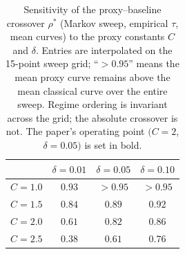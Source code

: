 \documentclass[sensors,article,submit,pdftex,moreauthors]{Definitions/mdpi}
\providecommand{\DIFadd}[1]{{\protect\color{blue}#1}} %
\providecommand{\DIFdel}[1]{} %
\providecommand{\DIFaddend}{} %
\providecommand{\DIFaddFL}[1]{\DIFadd{#1}} %
\providecommand{\DIFdelFL}[1]{\DIFdel{#1}} %
\providecommand{\DIFaddbeginFL}{} %
\providecommand{\DIFaddendFL}{} %
\providecommand{\DIFdelbeginFL}{} %
\providecommand{\DIFdelendFL}{} %
\begin{document}
\DIFaddend \begin{table}[t]
\centering
\caption{\DIFdelbeginFL \DIFdelFL{Proxy-sensitivity ablation: alternative $\tau$ estimators on synthetic streams }\DIFdelendFL \DIFaddbeginFL \DIFaddFL{Sensitivity of the proxy--baseline crossover $\rho^{*}$ }\DIFaddendFL (\DIFdelbeginFL \DIFdelFL{$T = 4096$}\DIFdelendFL \DIFaddbeginFL \DIFaddFL{Markov sweep}\DIFaddendFL , \DIFdelbeginFL \DIFdelFL{$W = 20$}\DIFdelendFL \DIFaddbeginFL \DIFaddFL{empirical $\tau$}\DIFaddendFL , \DIFdelbeginFL \DIFdelFL{$n = 6$}\DIFdelendFL \DIFaddbeginFL \DIFaddFL{mean curves}\DIFaddendFL ) \DIFaddbeginFL \DIFaddFL{to the proxy constants $C$ and $\delta$}\DIFaddendFL . \DIFdelbeginFL \DIFdelFL{Qualitative }\DIFdelendFL \DIFaddbeginFL \DIFaddFL{Entries are interpolated on the 15-point sweep grid; ``$>0.95$'' means the mean proxy curve remains above the mean classical curve over the entire sweep. Regime }\DIFaddendFL ordering \DIFdelbeginFL \DIFdelFL{of regimes by $\tau$ }\DIFdelendFL is \DIFdelbeginFL \DIFdelFL{preserved }\DIFdelendFL \DIFaddbeginFL \DIFaddFL{invariant }\DIFaddendFL across \DIFdelbeginFL \DIFdelFL{all four estimators}\DIFdelendFL \DIFaddbeginFL \DIFaddFL{the grid}\DIFaddendFL ; \DIFdelbeginFL \DIFdelFL{proxy accuracy changes by at most $0.04$}\DIFdelendFL \DIFaddbeginFL \DIFaddFL{the absolute crossover is not}\DIFaddendFL . \DIFaddbeginFL \DIFaddFL{The paper's operating point $(C = 2$, $\delta = 0.05)$ is set in bold.}\DIFaddendFL }
\DIFaddbeginFL \label{tab:cdelta}
\begin{tabular}{@{}lccc@{}}
\toprule
 & $\delta = 0.01$ & $\delta = 0.05$ & $\delta = 0.10$ \\
\midrule
$C = 1.0$ & $0.93$ & $>0.95$ & $>0.95$ \\
$C = 1.5$ & $0.84$ & $0.89$ & $0.92$ \\
$C = 2.0$ & $0.61$ & $\mathbf{0.82}$ & $0.86$ \\
$C = 2.5$ & $0.38$ & $0.61$ & $0.76$ \\
\bottomrule
\end{tabular}
\end{table}
\end{document}
